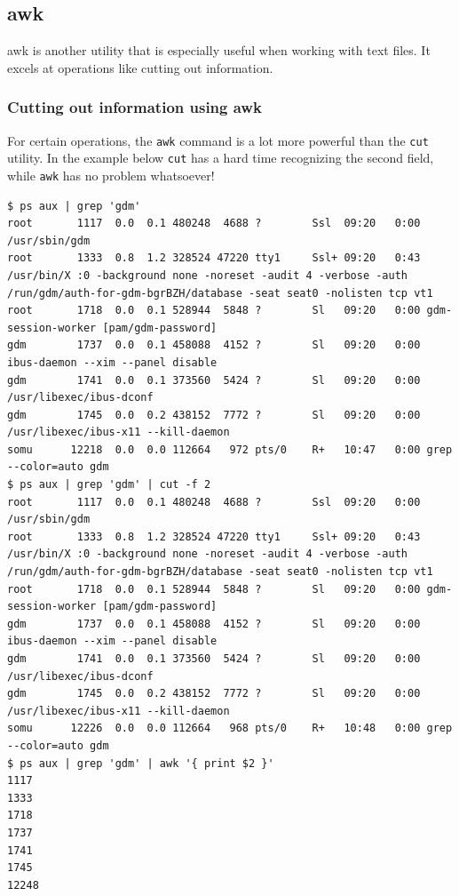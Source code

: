 \subsection{awk}
awk is another utility that is especially useful when working with text files. It excels at operations like cutting out information.

\subsubsection{Cutting out information using awk}
For certain operations, the \verb|awk| command is a lot more powerful than the \verb|cut| utility. In the example below \verb|cut| has a hard time recognizing the second field, while \verb|awk| has no problem whatsoever!

\begin{verbatim}
$ ps aux | grep 'gdm'
root       1117  0.0  0.1 480248  4688 ?        Ssl  09:20   0:00 /usr/sbin/gdm
root       1333  0.8  1.2 328524 47220 tty1     Ssl+ 09:20   0:43 /usr/bin/X :0 -background none -noreset -audit 4 -verbose -auth /run/gdm/auth-for-gdm-bgrBZH/database -seat seat0 -nolisten tcp vt1
root       1718  0.0  0.1 528944  5848 ?        Sl   09:20   0:00 gdm-session-worker [pam/gdm-password]
gdm        1737  0.0  0.1 458088  4152 ?        Sl   09:20   0:00 ibus-daemon --xim --panel disable
gdm        1741  0.0  0.1 373560  5424 ?        Sl   09:20   0:00 /usr/libexec/ibus-dconf
gdm        1745  0.0  0.2 438152  7772 ?        Sl   09:20   0:00 /usr/libexec/ibus-x11 --kill-daemon
somu      12218  0.0  0.0 112664   972 pts/0    R+   10:47   0:00 grep --color=auto gdm
$ ps aux | grep 'gdm' | cut -f 2
root       1117  0.0  0.1 480248  4688 ?        Ssl  09:20   0:00 /usr/sbin/gdm
root       1333  0.8  1.2 328524 47220 tty1     Ssl+ 09:20   0:43 /usr/bin/X :0 -background none -noreset -audit 4 -verbose -auth /run/gdm/auth-for-gdm-bgrBZH/database -seat seat0 -nolisten tcp vt1
root       1718  0.0  0.1 528944  5848 ?        Sl   09:20   0:00 gdm-session-worker [pam/gdm-password]
gdm        1737  0.0  0.1 458088  4152 ?        Sl   09:20   0:00 ibus-daemon --xim --panel disable
gdm        1741  0.0  0.1 373560  5424 ?        Sl   09:20   0:00 /usr/libexec/ibus-dconf
gdm        1745  0.0  0.2 438152  7772 ?        Sl   09:20   0:00 /usr/libexec/ibus-x11 --kill-daemon
somu      12226  0.0  0.0 112664   968 pts/0    R+   10:48   0:00 grep --color=auto gdm
$ ps aux | grep 'gdm' | awk '{ print $2 }'
1117
1333
1718
1737
1741
1745
12248
\end{verbatim}